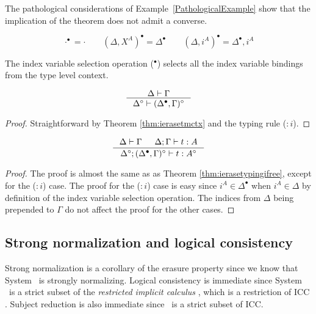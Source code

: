 \begin{remark}
The pathological considerations of Example~\ref{PathologicalExample} show
that the implication of the theorem does not admit a converse.
\end{remark}

\begin{definition}
\[ \cdot^\bullet = \cdot \qquad
	(\Delta,X^A)^\bullet = \Delta^\bullet \qquad
	(\Delta,i^A)^\bullet = \Delta^\bullet,i^A
\]
\end{definition}\noindent
The index variable selection operation ($^\bullet$) selects
all the index variable bindings from the type level context.
\begin{theorem}
\label{thm:ierasetmctxivs}
\[ \inference{\Delta |- \Gamma}{\Delta^\circ |- (\Delta^\bullet,\Gamma)^\circ}
\]
\end{theorem}
\begin{proof}
Straightforward by Theorem \ref{thm:ierasetmctx} and the typing rule ($:i$).
\end{proof}

\begin{theorem}
\label{thm:ierasetypingall}
\[ \inference{\Delta |- \Gamma & \Delta;\Gamma |- t : A}
		{\Delta^\circ;(\Delta^\bullet,\Gamma)^\circ |- t : A^\circ}
\]
\end{theorem}
\begin{proof}
	The proof is almost the same as as Theorem \ref{thm:ierasetypingifree},
	except for the ($:i$) case. The proof for the ($:i$) case is easy
	since $i^A \in \Delta^\bullet$ when $i^A \in \Delta$ by definition of
	the index variable selection operation. The indices from $\Delta$
	being prepended to $\Gamma$ do not affect the proof for the other cases.
\end{proof}


\subsection{Strong normalization and logical consistency}
\label{ssec:sn}
Strong normalization is a corollary of the erasure property since we know that
System \Fw\ is strongly normalizing. Logical consistency is immediate since
System \Fi\ is a strict subset of the \emph{restricted implicit calculus}
\cite{Miquel00}, which is a restriction of ICC \cite{Miquel01}.
Subject reduction is also immediate since \Fi\ is a strict subset of ICC.

